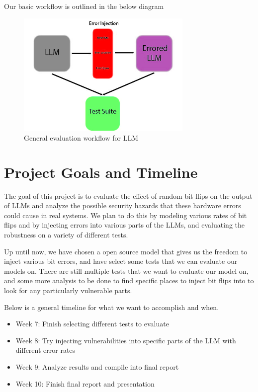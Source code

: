 \documentclass[a4paper]{article}
\begin{document}
Our basic workflow is outlined in the below diagram

\begin{figure}[ht]
	\begin{center}
		\includegraphics[height=6cm]{workflow.jpg}
		\caption{General evaluation workflow for LLM}
		\label{workflow}
	\end{center}
\end{figure}
\section{Project Goals and Timeline}

The goal of this project is to evaluate the effect of random bit flips on the output of LLMs and analyze the possible security hazards that these hardware errors could cause in real systems. We plan to do this by modeling various rates of bit flips and by injecting errors into various parts of the LLMs, and evaluating the robustness on a variety of different tests.

Up until now, we have chosen a open source model that gives us the freedom to inject various bit errors, and have select some tests that we can evaluate our models on. There are still multiple tests that we want to evaluate our model on, and some more analysis to be done to find specific places to inject bit flips into to look for any particularly vulnerable parts.

Below is a general timeline for what we want to accomplish and when.

\begin{itemize}
	\item Week 7: Finish selecting different tests to evaluate
	\item Week 8: Try injecting vulnerabilities into specific parts of the LLM with different error rates
	\item Week 9: Analyze results and compile into final report
	\item  Week 10: Finish final report and presentation
\end{itemize}
\end{document}
